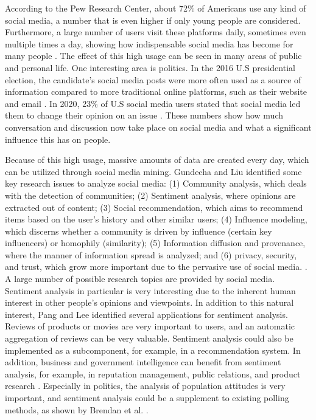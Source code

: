 According to the Pew Research Center, about 72\% of Americans use any kind of social media, a number that is even higher if only young people are considered. Furthermore, a large number of users visit these platforms daily, sometimes even multiple times a day, showing how indispensable social media has become for many people \cite{pew:socialmedia}. The effect of this high usage can be seen in many areas of public and personal life. One interesting area is politics. In the 2016 U.S presidential election, the candidate's social media posts were more often used as a source of information compared to more traditional online platforms, such as their website and email \cite{pew:2016source}. In 2020, 23\% of U.S social media users stated that social media led them to change their opinion on an issue \cite{pew:2020influence}. These numbers show how much conversation and discussion now take place on social media and what a significant influence this has on people.

Because of this high usage, massive amounts of data are created every day, which can be utilized through social media mining. Gundecha and Liu identified some key research issues to analyze social media: (1) Community analysis, which deals with the detection of communities; (2) Sentiment analysis, where opinions are extracted out of content; (3) Social recommendation, which aims to recommend items based on the user's history and other similar users; (4) Influence modeling, which discerns whether a community is driven by influence (certain key influencers) or homophily (similarity); (5) Information diffusion and provenance, where the manner of information spread is analyzed; and (6) privacy, security, and trust, which grow more important due to the pervasive use of social media. \cite{Gundecha2012MiningSM}.
A large number of possible research topics are provided by social media. Sentiment analysis in particular is very interesting due to the inherent human interest in other people's opinions and viewpoints. In addition to this natural interest, Pang and Lee identified several applications for sentiment analysis. Reviews of products or movies are very important to users, and an automatic aggregation of reviews can be very valuable. Sentiment analysis could also be implemented as a subcomponent, for example, in a recommendation system. In addition, business and government intelligence can benefit from sentiment analysis, for example, in reputation management, public relations, and product research \cite{pang-etal-2002-thumbs}. Especially in politics, the analysis of population attitudes is very important, and sentiment analysis could be a supplement to existing polling methods, as shown by Brendan et al. \cite{polls}. 

